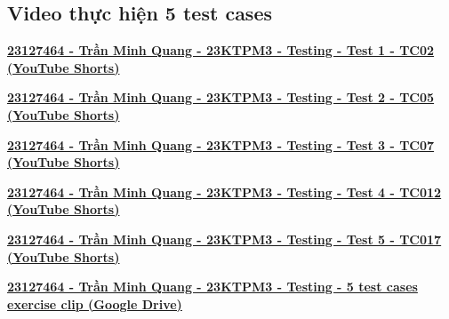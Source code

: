 \subsection{Video thực hiện 5 test cases}
\begin{center}
    \href{https://youtube.com/shorts/zP7rZle3vHY?feature=share}{\textbf{23127464 - Trần Minh Quang - 23KTPM3 - Testing - Test 1 - TC02 (YouTube Shorts)}}

    \href{https://youtube.com/shorts/B1IwJKy1fYs?feature=share}{\textbf{23127464 - Trần Minh Quang - 23KTPM3 - Testing - Test 2 - TC05 (YouTube Shorts)}}

    \href{https://youtube.com/shorts/rhL1CJwmJVw?feature=share}{\textbf{23127464 - Trần Minh Quang - 23KTPM3 - Testing - Test 3 - TC07 (YouTube Shorts)}}

    \href{https://youtube.com/shorts/k-3jMjyT6Cc?feature=share}{\textbf{23127464 - Trần Minh Quang - 23KTPM3 - Testing - Test 4 - TC012 (YouTube Shorts)}}

    \href{https://youtube.com/shorts/VNU-UW6HnD4?feature=share}{\textbf{23127464 - Trần Minh Quang - 23KTPM3 - Testing - Test 5 - TC017 (YouTube Shorts)}}

\end{center}

\begin{center}
    \href{https://drive.google.com/drive/folders/14hT3FUTGG4OND81KT8Q4gqCGOPtMGvM2?usp=sharing}{\textbf{23127464 - Trần Minh Quang - 23KTPM3 - Testing - 5 test cases exercise clip (Google Drive)}}
\end{center}

